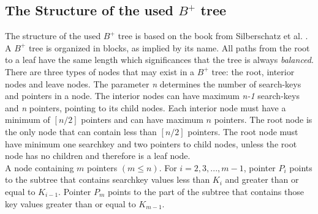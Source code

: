 \documentclass[abstracton,12pt]{scrreprt}
\begin{document}
\subsection{The Structure of the used $B^+$ tree}
\label{structureBtree}
The structure of the used $B^+$ tree is based on the book from Silberschatz et al. \cite{DatabaseSystemC}. \\
A $B^+$ tree is organized in blocks, as implied by its name. All paths from the root to a leaf have the same length which significances that the tree is always \emph{balanced}. \\There are three types of nodes that may exist in a $B^+$ tree: the root, interior nodes and leave nodes.
The parameter \emph{n} determines the number of search-keys and pointers in a node. The interior nodes can have maximum \emph{n-1} search-keys and \emph{n} pointers, pointing to its child nodes. Each interior node must have a minimum of $[n/2]$ pointers and can have maximum $n$ pointers. The root node is the only node that can contain less than $[n/2]$ pointers. The root node must have minimum one searchkey and two pointers to child nodes, unless the root node has no children and therefore is a leaf node.  \\ 
A node containing $m$ pointers $\left(m \leq n\right)$. For $i = 2, 3, . . . ,m-1$, pointer $P_i$ points to the subtree that contains searchkey values less than $K_i$ and greater than or equal to $K_{i-1}$. Pointer $P_m$ points to the part of the subtree that contains those key values greater than or equal to $K_{m-1}$. 
\end{document}
